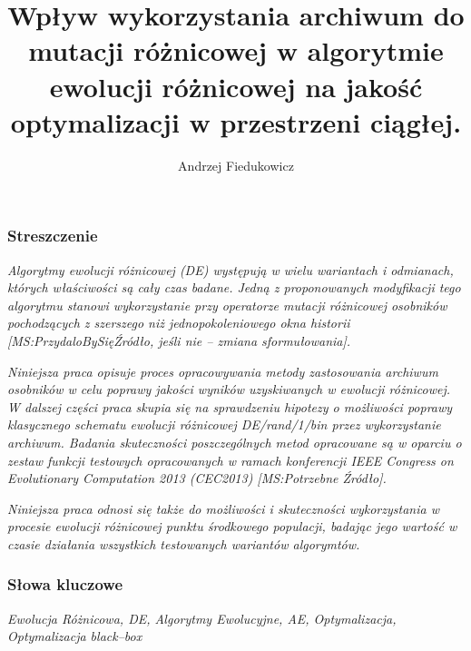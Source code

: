 \documentclass[12pt,a4paper]{report}
\title{\textbf{Wpływ wykorzystania archiwum do mutacji różnicowej w algorytmie ewolucji różnicowej na jakość optymalizacji w przestrzeni ciągłej.}}
\author{Andrzej Fiedukowicz}
\date{}
\begin{document}

\maketitle
\tableofcontents


\newpage
\subsubsection{Streszczenie}
\par{
\emph{
Algorytmy ewolucji różnicowej (DE) występują w wielu wariantach i odmianach, których właściwości są cały czas badane. Jedną z proponowanych modyfikacji tego algorytmu stanowi wykorzystanie przy operatorze mutacji różnicowej osobników pochodzących z szerszego niż jednopokoleniowego okna historii [MS:PrzydaloBySięŹródło, jeśli nie -- zmiana sformułowania].
}
}
\par{
\emph{
Niniejsza praca opisuje proces opracowywania metody zastosowania archiwum osobników w celu poprawy jakości wyników uzyskiwanych w ewolucji różnicowej. W dalszej części praca skupia się na sprawdzeniu hipotezy o możliwości poprawy klasycznego schematu ewolucji różnicowej DE/rand/1/bin przez wykorzystanie archiwum.
Badania skuteczności poszczególnych metod opracowane są w oparciu o zestaw funkcji testowych opracowanych w ramach konferencji IEEE Congress on Evolutionary Computation 2013 (CEC2013) [MS:Potrzebne Źródło].
}
}
\par{
\emph{
Niniejsza praca odnosi się także do możliwości i skuteczności wykorzystania w procesie ewolucji różnicowej punktu środkowego populacji, badając jego wartość w czasie działania wszystkich testowanych wariantów algorymtów.
}
}
\subsubsection{Słowa kluczowe}
\par{
\emph{Ewolucja Różnicowa, DE, Algorytmy Ewolucyjne, AE, Optymalizacja, Optymalizacja black--box}
}
\end{document}
